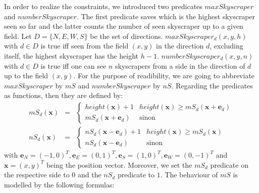 \documentclass[a4paper, 12pt, titlepage]{article}
\begin{document}
In order to realize the constraints, we introduced two predicates $maxSkyscraper$ and $numberSkyscraper$. The first predicate saves which is the highest skyscraper seen so far and the latter counts the number of seen skyscraper up to a given field. Let $D=\{N, E, W, S\}$ be the set of directions. $maxSkyscraper_{d}(x,y,h)$ with $d \in D$ is true iff seen from the field $(x,y)$ in the direction $d$, excluding itself, the highest skyscraper has the height $h-1$. $numberSkyscraper_{d}(x,y,n)$ with $d \in D$ is true iff one can see $n$ skyscrapers from a side in the direction of $d$ up to the field $(x,y)$. For the purpose of readibility, we are going to abbreviate $maxSkyscraper$ by $mS$ and $numberSkyscraper$ by $nS$. Regarding the predicates as functions, then they are defined by:
	\begin{eqnarray}
		mS_{d}(\pmb x) &=& 
		\begin{cases}
			height(\pmb x)+1 & height(\pmb x) \ge mS_{d}(\pmb x + \pmb e_{d})\\
			mS_{d}(\pmb x + \pmb e_{d}) &\text{sinon}
		\end{cases}
		\\
		nS_{d}(\pmb x) &=&
		\begin{cases}
			nS_{d}(\pmb x - \pmb e_{d}) + 1 & height(\pmb x) \ge mS_{d}(\pmb x)\\
			nS_{d}(\pmb x - \pmb e_{d}) &\text{sinon}
		\end{cases}
	\end{eqnarray}
with $\pmb e_{N} = (-1,0)^T, \pmb e_{E} = (0,1)^T, \pmb e_{S} = (1,0)^T,\pmb e_{W} = (0,-1)^T$ and $\pmb x = (x,y)^T$ being the position vector. Moreover, we set the $mS_{d}$ predicate on the respective side to $0$ and the $nS_{d}$ predicate to $1$. The behaviour of $mS$ is modelled by the following formulas:
\end{document}
